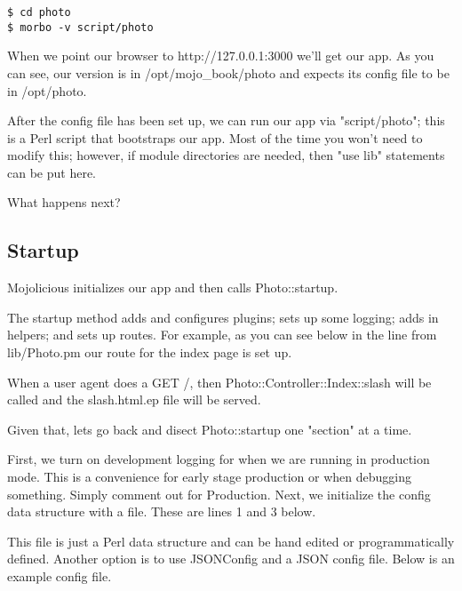 \documentclass[14pt]{extreport}
\begin{document}
\begin{lstlisting}[style=BashInputStyle]
$ cd photo
$ morbo -v script/photo
\end{lstlisting}

When we point our browser to http://127.0.0.1:3000 we'll get our app.  As you
can see, our version is in /opt/mojo\_book/photo and expects its config file to
be in /opt/photo.

After the config file has been set up, we can run our app via "script/photo";
this is a Perl script that bootstraps our app.  Most of the time you won't need
to modify this; however, if module directories are needed, then "use lib" statements
can be put here.

What happens next?

\subsection{Startup}

Mojolicious initializes our app and then calls Photo::startup.

The startup method adds and configures plugins; sets up some logging; adds in
helpers; and sets up routes.  For example, as you can see below in the line
from lib/Photo.pm our route for the index page is set up.



When a user agent does a GET /, then Photo::Controller::Index::slash will be
called and the slash.html.ep file will be served.

Given that, lets go back and disect Photo::startup one "section" at a time.

First, we turn on development logging for when we are running in production
mode.  This is a convenience for early stage production or when debugging
something.  Simply comment out for Production.  Next, we initialize the
config data structure with a file.  These are lines 1 and 3 below.



This file is just a Perl data structure and can be hand edited or
programmatically defined.  Another option is to use JSONConfig and a JSON
config file.  Below is an example config file.


\end{document}
